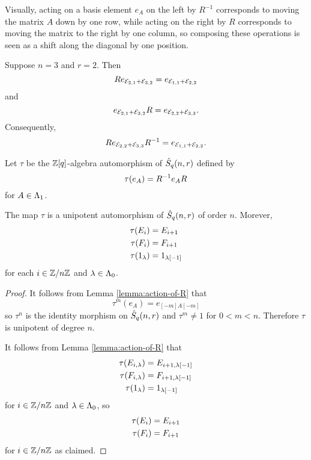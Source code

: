 \documentclass[a4paper, 11pt, twoside]{report}
\begin{document}
Visually, acting on a basis element $e_A$ on the left by $R^{-1}$ corresponds to moving the matrix $A$ down by one row, while acting on the right by $R$ corresponds to moving the matrix to the right by one column, so composing these operations is seen as a shift along the diagonal by one position.

\begin{example}
Suppose $n=3$ and $r=2$. Then
\begin{equation*}
Re_{\mathcal{E}_{2,1}+\mathcal{E}_{3,2}} = e_{\mathcal{E}_{1,1}+\mathcal{E}_{2,2}}
\end{equation*}
and
\begin{equation*}
e_{\mathcal{E}_{2,1}+\mathcal{E}_{3,2}}R = e_{\mathcal{E}_{2,2}+\mathcal{E}_{3,3}}.
\end{equation*}
Consequently,
\begin{equation*}
Re_{\mathcal{E}_{2,2}+\mathcal{E}_{3,3}}R^{-1} = e_{\mathcal{E}_{1,1}+\mathcal{E}_{2,2}}.
\end{equation*}
\end{example}

Let $\tau$ be the $\mathbb{Z}[q]$-algebra automorphism of $\hat{S}_q(n,r)$ defined by
\begin{equation*}
\tau{(e_A)} = R^{-1}e_A R
\end{equation*}
for $A\in\Lambda_1{}$.

\begin{lemma}\label{lemma:conjugation-by-R}
The map $\tau$ is a unipotent automorphism of $\hat{S}_q(n,r)$ of order $n$. Morever,
\begin{align*}
\tau{(E_i)} &= E_{i+1}\\
\tau{(F_i)} &= F_{i+1}\\
\tau{(1_\lambda)} &= 1_{\lambda[-1]}
\end{align*}
for each $i\in\mathbb{Z}/{n \mathbb{Z}}$ and $\lambda\in\Lambda_0{}$.
\end{lemma}

\begin{proof}
It follows from Lemma \ref{lemma:action-of-R} that
\begin{equation*}
\tau^m{(e_A)} = e_{[-m]A[-m]}
\end{equation*}
so $\tau^n$ is the identity morphism on $\hat{S}_q(n,r)$ and $\tau^m\neq 1$ for $0<m<n$. Therefore $\tau$ is unipotent of degree $n$.

It follows from Lemma \ref{lemma:action-of-R} that
\begin{align*}
\tau{(E_{i,\lambda})} &= E_{i+1,\lambda[-1]}\\
\tau{(F_{i,\lambda})} &= F_{i+1,\lambda[-1]}\\
\tau{(1_\lambda)} &= 1_{\lambda[-1]}
\end{align*}
for $i\in\mathbb{Z}/{n \mathbb{Z}}$ and $\lambda\in\Lambda_0{}$, so
\begin{align*}
\tau{(E_i)} &= E_{i+1}\\
\tau{(F_i)} &= F_{i+1}
\end{align*}
for $i\in\mathbb{Z}/{n \mathbb{Z}}$ as claimed.
\end{proof}
\end{document}
